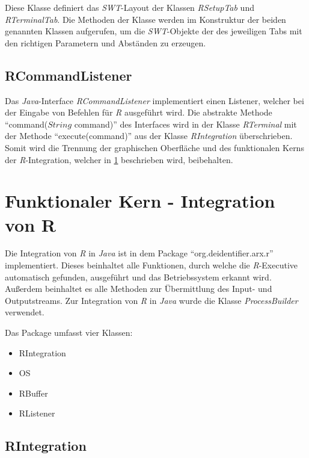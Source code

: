 \documentclass[a4paper, 12pt]{report} %
\begin{document}
Diese Klasse definiert das \textit{SWT}-Layout der Klassen \textit{RSetupTab} und \textit{RTerminalTab}. 
Die Methoden der Klasse werden im Konstruktur der beiden genannten Klassen aufgerufen, um die \textit{SWT}-Objekte der des jeweiligen Tabs mit den richtigen Parametern und Abständen zu erzeugen.

\subsection{RCommandListener} \label{RCommandListener}

Das \textit{Java}-Interface \textit{RCommandListener} implementiert einen Listener, welcher bei der Eingabe von Befehlen für \textit{R} ausgeführt wird. Die abstrakte Methode "`command($String$ command)"' des Interfaces wird in der Klasse \textit{RTerminal} mit der Methode "`execute(command)"' aus der Klasse \textit{RIntegration} überschrieben. Somit wird die Trennung der graphischen Oberfläche und des funktionalen Kerns der \textit{R}-Integration, welcher in \ref{funktionaler Kern} beschrieben wird, beibehalten.


\section{Funktionaler Kern - Integration von R} \label{funktionaler Kern}

Die Integration von \textit{R} in \textit{Java} ist in dem Package "`org.deidentifier.arx.r"' implementiert. Dieses beinhaltet alle Funktionen, durch welche die \textit{R}-Executive automatisch gefunden, ausgeführt und das Betriebssystem erkannt wird. Außerdem beinhaltet es alle Methoden zur Übermittlung des Input- und Outputstreams.
Zur Integration von \textit{R} in \textit{Java} wurde die Klasse \textit{ProcessBuilder} verwendet.

\begin{samepage}
Das Package umfasst vier Klassen:
\begin{itemize}
	\item RIntegration
	\item OS
	\item RBuffer
	\item RListener
\end{itemize}
\end{samepage}


\subsection{RIntegration} \label{RIntegration}
\end{document}
